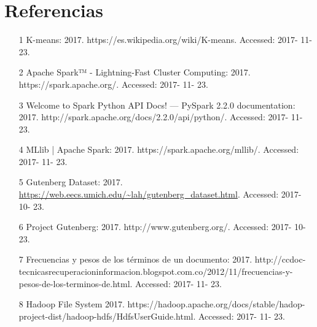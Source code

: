 \section{Referencias}
\begin{enumerate}
\item [1] K-means: 2017. https://es.wikipedia.org/wiki/K-means. Accessed: 2017- 11- 23.
\item [2] Apache Spark™ - Lightning-Fast Cluster Computing: 2017. https://spark.apache.org/. Accessed: 2017- 11- 23.
\item [3] Welcome to Spark Python API Docs! — PySpark 2.2.0 documentation: 2017. http://spark.apache.org/docs/2.2.0/api/python/. Accessed: 2017- 11- 23.
\item [4] MLlib | Apache Spark: 2017. https://spark.apache.org/mllib/. Accessed: 2017- 11- 23.
\item [5] Gutenberg Dataset: 2017. \url{https://web.eecs.umich.edu/~lah/gutenberg_dataset.html}. Accessed: 2017- 10- 23.
\item [6] Project Gutenberg: 2017. http://www.gutenberg.org/. Accessed: 2017- 10- 23.
\item [7]Frecuencias y pesos de los términos de un documento: 2017. http://ccdoc-tecnicasrecuperacioninformacion.blogspot.com.co/2012/11/frecuencias-y-pesos-de-los-terminos-de.html. Accessed: 2017- 11- 23.
\item [8] Hadoop File System 2017. https://hadoop.apache.org/docs/stable/hadop-project-dist/hadoop-hdfs/HdfsUserGuide.html. Accessed: 2017- 11- 23.
\end{enumerate}

